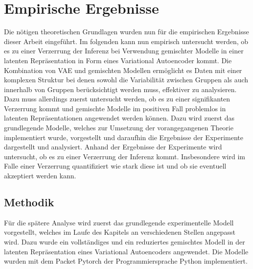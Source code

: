 \documentclass[%
thesis=student,%
coverpage=false,%
titlepage=false,%
headmarks=true, %
german,%
font=libertine, %
math=newpxtx, %
BCOR=5mm,%
coverBCOR=11mm%
]{tumbook}
\theoremstyle{break}
\begin{document}
\chapter{Empirische Ergebnisse}
Die nötigen theoretischen Grundlagen wurden nun für die empirischen Ergebnisse dieser Arbeit eingeführt. Im folgenden kann nun empirisch untersucht werden, ob es zu einer Verzerrung der Inferenz bei Verwendung gemischter Modelle in einer latenten Repräsentation in Form eines Variational Autoencoder kommt. Die Kombination von VAE und gemischten Modellen ermöglicht es Daten mit einer komplexen Struktur bei denen sowohl die Variabilität zwischen Gruppen als auch innerhalb von Gruppen berücksichtigt werden muss, effektiver zu analysieren. Dazu muss allerdings zuerst untersucht werden, ob es zu einer signifikanten Verzerrung kommt und gemischte Modelle im positiven Fall problemlos in latenten Repräsentationen angewendet werden können. Dazu wird zuerst das grundlegende Modelle, welches zur Umsetzung der vorangegangenen Theorie implementiert wurde, vorgestellt und daraufhin die Ergebnisse der Experimente dargestellt und analysiert. Anhand der Ergebnisse der Experimente wird untersucht, ob es zu einer Verzerrung der Inferenz kommt. Insbesondere wird im Falle einer Verzerrung quantifiziert wie stark diese ist und ob sie eventuell akzeptiert werden kann.\\
\section{Methodik}
Für die spätere Analyse wird zuerst das grundlegende experimentelle Modell vorgestellt, welches im Laufe des Kapitels an verschiedenen Stellen angepasst wird. Dazu wurde ein vollständiges und ein reduziertes gemischtes Modell in der latenten Repräsentation eines Variational Autoencoders angewendet. Die Modelle wurden mit dem Packet Pytorch der Programmiersprache Python implementiert.
\end{document}
